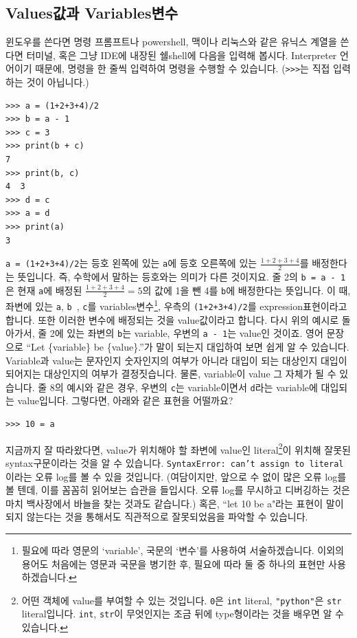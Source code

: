 \documentclass[../main.tex]{subfiles}
\begin{document}
\subsection{Values값과 Variables변수}
윈도우를 쓴다면 명령 프롬프트나 powershell, 맥이나 리눅스와 같은 유닉스 계열을 쓴다면 터미널, 혹은 그냥 IDE에 내장된 쉘shell에 다음을 입력해 봅시다.
Interpreter 언어이기 때문에, 명령을 한 줄씩 입력하여 명령을 수행할 수 있습니다.
(\texttt{>>>}는 직접 입력하는 것이 아닙니다.)
\begin{verbatim}
>>> a = (1+2+3+4)/2
>>> b = a - 1
>>> c = 3
>>> print(b + c)
7
>>> print(b, c)
4  3
>>> d = c
>>> a = d
>>> print(a)
3
\end{verbatim}
\texttt{a = (1+2+3+4)/2}는 등호 왼쪽에 있는 \texttt{a}에 등호 오른쪽에 있는 $\frac{1+2+3+4}{2}$를 배정한다는 뜻입니다.
즉, 수학에서 말하는 등호와는 의미가 다른 것이지요.
줄 2의 \texttt{b = a - 1}은 현재 \texttt{a}에 배정된 $\frac{1+2+3+4}{2} = 5$의 값에 1을 뺀 4를 \texttt{b}에 배정한다는 뜻입니다.
이 때, 좌변에 있는 \texttt{a}, \texttt{b	}, \texttt{c}를 variables변수\footnote{필요에 따라 영문의 `variable', 국문의 `변수'를 사용하여 서술하겠습니다. 이외의 용어도 처음에는 영문과 국문을 병기한 후, 필요에 따라 둘 중 하나의 표현만 사용하겠습니다.}, 우측의 \texttt{(1+2+3+4)/2}를 expression표현이라고 합니다.
또한 이러한 변수에 배정되는 것을 value값이라고 합니다.
다시 위의 예시로 돌아가서, 줄 2에 있는 좌변의 \texttt{b}는 variable, 우변의 \texttt{a - 1}는 value인 것이죠.
영어 문장으로 ``Let \{variable\} be \{value\}.''가 말이 되는지 대입하여 보면 쉽게 알 수 있습니다.
Variable과 value는 문자인지 숫자인지의 여부가 아니라 대입이 되는 대상인지 대입이 되어지는 대상인지의 여부가 결정짓습니다.
물론, variable이 value 그 자체가 될 수 있습니다.
줄 8의 예시와 같은 경우, 우변의 \texttt{c}는 variable이면서 \texttt{d}라는 variable에 대입되는 value입니다.
그렇다면, 아래와 같은 표현을 어떨까요?
\begin{verbatim}
>>> 10 = a
\end{verbatim}
지금까지 잘 따라왔다면, value가 위치해야 할 좌변에 value인 literal\footnote{어떤 객체에 value를 부여할 수 있는 것입니다. \texttt{0}은 \texttt{int} literal, \texttt{"python"}은 \texttt{str} literal입니다. \texttt{int}, \texttt{str}이 무엇인지는 조금 뒤에 type형이라는 것을 배우면 알 수 있습니다.}이 위치해 잘못된 syntax구문이라는 것을 알 수 있습니다.
\texttt{SyntaxError: can't assign to literal}이라는 오류 log를 볼 수 있을 것입니다.
(여담이지만, 앞으로 수 없이 많은 오류 log를 볼 텐데, 이를 꼼꼼히 읽어보는 습관을 들입시다.
오류 log를 무시하고 디버깅하는 것은 마치 백사장에서 바늘을 찾는 것과도 같습니다.)
혹은, ``let 10 be a"라는 표현이 말이 되지 않는다는 것을 통해서도 직관적으로 잘못되었음을 파악할 수 있습니다.
\end{document}
